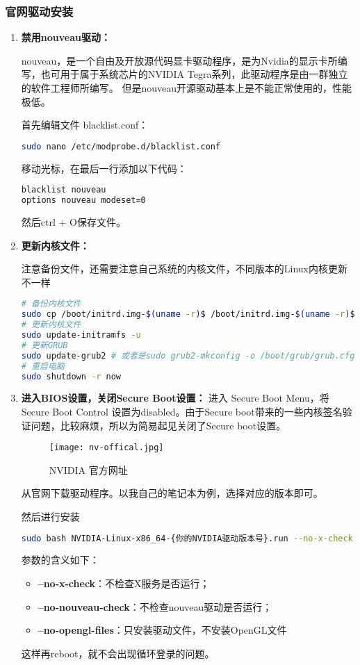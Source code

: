 \documentclass[lang=cn,a4paper,newtx]{elegantpaper}
\begin{document}
\subsubsection{官网驱动安装}
\begin{enumerate}[label=（\arabic*）]
  \item \textbf{禁用nouveau驱动：} 
  
  nouveau，是一个自由及开放源代码显卡驱动程序，是为Nvidia的显示卡所编写，也可用于属于系统芯片的NVIDIA Tegra系列，此驱动程序是由一群独立的软件工程师所编写。
  但是nouveau开源驱动基本上是不能正常使用的，性能极低。

  首先编辑文件 blacklist.conf：
  \begin{lstlisting}[language=bash]
sudo nano /etc/modprobe.d/blacklist.conf
  \end{lstlisting}

  移动光标，在最后一行添加以下代码：
  \begin{lstlisting}[language=bash]
blacklist nouveau
options nouveau modeset=0
  \end{lstlisting}
  然后ctrl + O保存文件。
  \item \textbf{更新内核文件：}

  注意备份文件，还需要注意自己系统的内核文件，不同版本的Linux内核更新不一样

  \begin{lstlisting}[language=bash]
# 备份内核文件
sudo cp /boot/initrd.img-$(uname -r)$ /boot/initrd.img-$(uname -r)$.bak
# 更新内核文件
sudo update-initramfs -u
# 更新GRUB
sudo update-grub2 # 或者是sudo grub2-mkconfig -o /boot/grub/grub.cfg
# 重启电脑
sudo shutdown -r now
  \end{lstlisting}
  \item \textbf{进入BIOS设置，关闭Secure Boot设置：}
  进入 Secure Boot Menu，将Secure Boot Control 设置为disabled。由于Secure boot带来的一些内核签名验证问题，比较麻烦，所以为简易起见关闭了Secure boot设置。
  \begin{figure}[hbpt]
    \centering
    \texttt{[image: nv-offical.jpg]}
    \caption{NVIDIA 官方网址}
    \label{fig:nv-offical}
  \end{figure}

  从官网下载驱动程序。以我自己的笔记本为例，选择对应的版本即可。

  然后进行安装
  \begin{lstlisting}[language=bash]
    sudo bash NVIDIA-Linux-x86_64-{你的NVIDIA驱动版本号}.run --no-x-check --no-nouveau-check --no-opengl-files
  \end{lstlisting}

  参数的含义如下：
  \begin{itemize}
    \item \textbf{--no-x-check}：不检查X服务是否运行；
    \item \textbf{--no-nouveau-check}：不检查nouveau驱动是否运行；
    \item \textbf{--no-opengl-files}：只安装驱动文件，不安装OpenGL文件  
  \end{itemize}

  这样再reboot，就不会出现循环登录的问题。

\end{enumerate}
\end{document}
